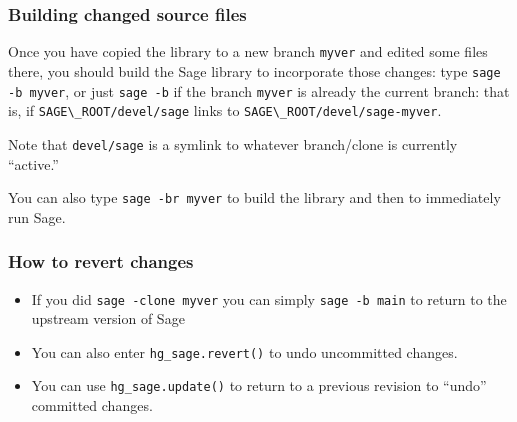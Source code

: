 \documentclass[11pt,blackandwhite]{beamer}
\newcommand{\code}{\lstinline}
\begin{document}
\begin{frame}
\frametitle{Building changed source files}
Once you have copied the library to a new branch \code{myver} and
edited some files there, you should build the Sage library to
incorporate those changes: type \code{sage -b myver}, or just
\code{sage -b} if the branch \code{myver} is already the
current branch: that is, if \code{SAGE\_ROOT/devel/sage} links
to \code{SAGE\_ROOT/devel/sage-myver}.

\vspace{1em}

Note that \code{devel/sage} is a symlink to whatever branch/clone is currently
``active.''

\vspace{1em}

You can also type \code{sage -br myver} to build the library and then to
immediately run Sage.
\end{frame}

\begin{frame}
\frametitle{How to revert changes}
\begin{itemize}
 \item If you did \code{sage -clone myver} you can simply \code{sage -b main} to
return to the upstream version of Sage
 \item You can also enter \code{hg_sage.revert()} to undo uncommitted changes.
 \item You can use \code{hg_sage.update()} to return to a previous revision to
``undo'' committed changes.
\end{itemize}
 
\end{frame}
\end{document}
